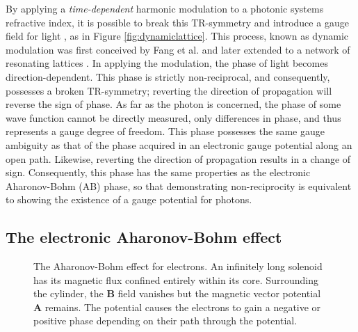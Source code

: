 By applying a \textit{time-dependent} harmonic modulation to a photonic systems refractive index, it is possible to break this TR-symmetry and introduce a gauge field for light \cite{Fang2012}, as in Figure \ref{fig:dynamiclattice}. This process, known as dynamic modulation was first conceived by Fang et al. and later extended to a network of resonating lattices \cite{Fang2012a}. In applying the modulation, the phase of light becomes direction-dependent. This phase is strictly non-reciprocal, and consequently, possesses a broken TR-symmetry; reverting the direction of propagation will reverse the sign of phase. As far as the photon is concerned, the phase of some wave function cannot be directly measured, only differences in phase, and thus represents a gauge degree of freedom. This phase possesses the same gauge ambiguity as that of the phase acquired in an electronic gauge potential along an open path. Likewise, reverting the direction of propagation results in a change of sign. Consequently, this phase has the same properties as the electronic Aharonov-Bohm (AB) phase, so that demonstrating non-reciprocity is equivalent to showing the existence of a gauge potential for photons.  

\subsection{The electronic Aharonov-Bohm effect}

\begin{figure}[t]
	\centering
	\def\svgwidth{0.8\textwidth}
	\begin{normalsize}
		
	\end{normalsize}
	\caption[Aharonov-Bohm effect for charged particles]{The Aharonov-Bohm effect for electrons. An infinitely long solenoid has its magnetic flux confined entirely within its core. Surrounding the cylinder, the $\bm{B}$ field vanishes but the magnetic vector potential $\bm{A}$ remains. The potential causes the electrons to gain a negative or positive phase depending on their path through the potential.}
	\label{fig:abeffectfinal}
\end{figure}


